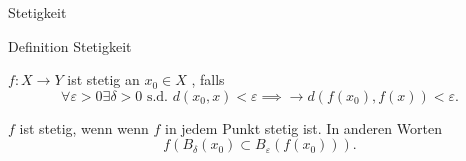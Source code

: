 \documentclass[class=article, crop=false]{standalone}
\begin{document}
\begin{zettel}{Stetigkeit}
\begin{flashcard}
\begin{question}
    Definition Stetigkeit
\end{question}

\vspace*{-8pt}
\begin{definition}[Stetigkeit]
    $f:X \longrightarrow Y$ ist stetig an $x_0 \in  X$ , falls
\[
    \forall \varepsilon >  0 \exists  \delta  > 0 \text{ s.d. }  d (x_0 , x) < \varepsilon \implies \longrightarrow  d (f (x_0), f (x)) <  \varepsilon
.\]

    $f$ ist stetig, wenn wenn $f$ in jedem Punkt stetig ist.
    In anderen Worten
\[
    f (B_{\delta }(x_0) \subset B_{\varepsilon } (f (x_0)) )
.\]
\end{definition}
\end{flashcard}
\end{zettel}
\end{document}
